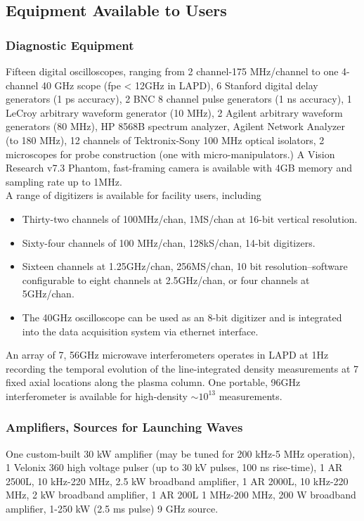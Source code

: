 \documentclass[11pt]{article}
\begin{document}
\pagebreak
\subsection{Equipment Available to Users}

\subsubsection{Diagnostic Equipment}
Fifteen digital oscilloscopes, ranging from 2 channel-175 MHz/channel to one 4-channel 40 GHz scope (fpe < 12GHz in LAPD), 6 Stanford digital delay generators (1 ps accuracy), 2 BNC 8 channel pulse generators (1 ns accuracy), 1 LeCroy arbitrary waveform generator (10 MHz), 2 Agilent arbitrary waveform generators (80 MHz), HP 8568B spectrum analyzer, Agilent Network Analyzer (to 180 MHz), 12 channels of Tektronix-Sony 100 MHz optical isolators, 2 microscopes for probe construction (one with micro-manipulators.) A Vision Research v7.3 Phantom, fast-framing camera is available with 4GB memory and sampling rate up to 1MHz.\\
	A range of digitizers is available for facility users, including
\begin{itemize}
\item Thirty-two channels of 100MHz/chan, 1MS/chan at 16-bit vertical resolution.
\item Sixty-four  channels of 100 MHz/chan, 128kS/chan, 14-bit digitizers.
\item Sixteen channels at 1.25GHz/chan, 256MS/chan, 10 bit resolution--software configurable  to eight channels at 2.5GHz/chan, or four channels at 5GHz/chan.

\item The 40GHz oscilloscope can be used as an 8-bit digitizer and is integrated into the data acquisition system via ethernet interface.
\end{itemize}
	An array of 7, 56GHz microwave interferometers operates in LAPD at 1Hz recording the temporal evolution of the line-integrated density measurements at 7 fixed axial locations along the plasma column. One portable, 96GHz interferometer is available for high-density $ \sim 10^{13}$ measurements.

\subsubsection{Amplifiers, Sources for Launching Waves}
One custom-built 30 kW amplifier (may be tuned for 200 kHz-5 MHz operation), 1 Velonix 360 high voltage pulser (up to 30 kV pulses, 100 ns rise-time), 1 AR 2500L, 10 kHz-220 MHz, 2.5 kW broadband amplifier, 1 AR 2000L, 10 kHz-220 MHz, 2 kW broadband amplifier, 1 AR 200L 1 MHz-200 MHz, 200 W broadband amplifier, 1-250 kW (2.5 ms pulse) 9 GHz source.
\end{document}

